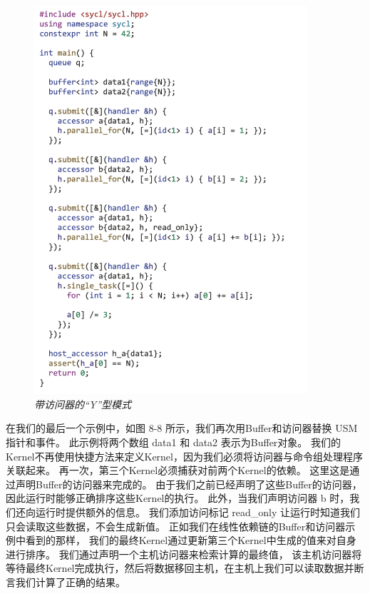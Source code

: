 \begin{figure}[H]
	\centering
	\includegraphics[width=0.9\textwidth]{figs/F8.8.png}
	\caption{\textit{带访问器的“Y”型模式 }}
\end{figure}

在我们的最后一个示例中，如图 8-8 所示，我们再次用Buffer和访问器替换 USM 指针和事件。 
此示例将两个数组 data1 和 data2 表示为Buffer对象。 
我们的Kernel不再使用快捷方法来定义Kernel，因为我们必须将访问器与命令组处理程序关联起来。 
再一次，第三个Kernel必须捕获对前两个Kernel的依赖。 这里这是通过声明Buffer的访问器来完成的。 
由于我们之前已经声明了这些Buffer的访问器，因此运行时能够正确排序这些Kernel的执行。 
此外，当我们声明访问器 b 时，我们还向运行时提供额外的信息。 
我们添加访问标记 read\_only 让运行时知道我们只会读取这些数据，不会生成新值。 
正如我们在线性依赖链的Buffer和访问器示例中看到的那样，
我们的最终Kernel通过更新第三个Kernel中生成的值来对自身进行排序。 
我们通过声明一个主机访问器来检索计算的最终值，
该主机访问器将等待最终Kernel完成执行，然后将数据移回主机，在主机上我们可以读取数据并断言我们计算了正确的结果。

